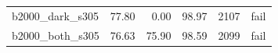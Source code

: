 \begin{table}[htbp]
\begin{tabular}{lrrrrr}
b2000\_\allowbreak{}dark\_\allowbreak{}s305 & %
77.80 & %
0.00 & %
98.97 & %
2107 & %
fail \\ %

b2000\_\allowbreak{}both\_\allowbreak{}s305 & %
76.63 & %
75.90 & %
98.59 & %
2099 & %
fail \\ %


\end{tabular}
\end{table}
